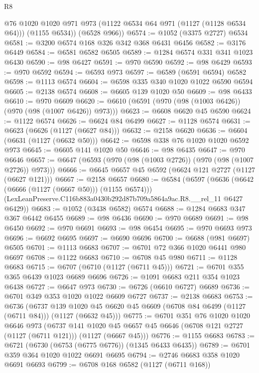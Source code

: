 \begin{lexlean}{R8}
\begin{coremodule}
        @76
        @1020
        @1020
        @971
        @973
        (@1122 @6534 @64 @971 (@1127 (@1128 @6534 @64)))
        (@1155 @6534))
      (@6528 @966))
@6574 := @1052 (@3375 @2727) @6534
@6581 := @3200 @6574 @168 @326 @342 @368 @6431 @6456
@6582 := @3176 @6449
@6584 := @6581 @6582 @6505
@6589 := @1284 @6574 @331 @341 @1023 @6430
@6590 := @98 @6427
@6591 := @970 @6590
@6592 := @98 @6429
@6593 := @970 @6592
@6594 := @6593 @973
@6597 := @6589 (@6591 @6594) @6582
@6598 := @1113 @6574
@6604 := @6598 @335 @340 @1020 @1022 @6590 @6594
@6605 := @2138 @6574
@6608 := @6605 @139 @1020 @50
@6609 := @98 @6433
@6610 := @970 @6609
@6620 := @6610 (@6591 (@970 (@98 (@1003 @6426)) (@970 (@98 (@1007 @6426)) @973)))
@6623 := @6608 @6620 @45 @6590
@6624 := @1122 @6574
@6626 := @6624 @84 @6499
@6627 := @1128 @6574
@6631 := @6623 (@6626 (@1127 (@6627 @84)))
@6632 := @2158 @6620
@6636 := @6604 (@6631 (@1127 (@6632 @50)))
@6642 := @6598 @338 @76 @1020 @1020 @6592 @973
@6645 := @6605 @141 @1020 @50
@6646 := @98 @6435
@6647 := @970 @6646
@6657 := @6647 (@6593 (@970 (@98 (@1003 @2726)) (@970 (@98 (@1007 @2726)) @973)))
@6666 := @6645 @6657 @45 @6592 (@6624 @121 @2727 (@1127 (@6627 @121)))
@6667 := @2158 @6657
@6680 := @6584
    (@6597
      (@6636 (@6642 (@6666 (@1127 (@6667 @50))) (@1155 @6574)))
      (LexLeanPreserve.C116b883a0430b292d87b709a5864a9ac.R8.__rel_11 @6427 @6429))
@6683 := @1052 (@3438 @6582) @6574
@6688 := @1284 @6683 @347 @367 @6442 @6455
@6689 := @98 @6436
@6690 := @970 @6689
@6691 := @98 @6450
@6692 := @970 @6691
@6693 := @98 @6454
@6695 := @970 @6693 @973
@6696 := @6692 @6695
@6697 := @6690 @6696
@6700 := @6688 (@981 @6697) @6505
@6701 := @1113 @6683
@6707 := @6701 @72 @366 @1020 @6441 @980 @6697
@6708 := @1122 @6683
@6710 := @6708 @45 @980
@6711 := @1128 @6683
@6715 := @6707 (@6710 (@1127 (@6711 @45)))
@6721 := @6701 @355 @365 @6439 @1023 @6689 @6696
@6726 := @1091 @6683 @211 @354 @1023 @6438
@6727 := @6647 @973
@6730 := @6726 (@6610 @6727) @6689
@6736 := @6701 @349 @353 @1020 @1022 @6609 @6727
@6737 := @2138 @6683
@6753 := @6736
    (@6737 @139 @1020 @45 @6620 @45 @6609 (@6708 @84 @6499 (@1127 (@6711 @84))) (@1127 (@6632 @45)))
@6775 := @6701
    @351
    @76
    @1020
    @1020
    @6646
    @973
    (@6737
      @141
      @1020
      @45
      @6657
      @45
      @6646
      (@6708 @121 @2727 (@1127 (@6711 @121)))
      (@1127 (@6667 @45)))
@6776 := @1155 @6683
@6783 := @6721 (@6730 (@6753 (@6775 @6776)) (@1345 @6433 @6435))
@6789 := @6701 @359 @364 @1020 @1022 @6691 @6695
@6794 := @2746 @6683 @358 @1020 @6691 @6693
@6799 := @6708 @168 @6582 (@1127 (@6711 @168))

\end{coremodule}
\end{lexlean}
